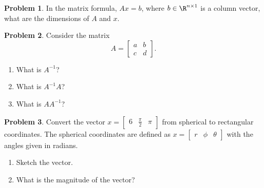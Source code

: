 \documentclass[10pt]{article}
\theoremstyle{definition}
\newtheorem{prob}{Problem}[section]
\newenvironment{subprob}%
{\renewcommand{\theenumi}{\alph{enumi}}\renewcommand{\labelenumi}{(\theenumi)}\begin{enumerate}}%
{\end{enumerate}}%
\begin{document}
\begin{prob}
    In the matrix formula, \( A x = b \), where \( b \in \R^{n\times1} \) is a column vector, what are the dimensions of \( A \) and \(x \).
\end{prob}

\begin{prob}
    Consider the matrix 
    \begin{equation}
    A = \begin{bmatrix} a & b \\ c & d \end{bmatrix}.
    \end{equation}
    \begin{subprob}
    \item What is \( A^{-1} \)?
    \item What is \( A^{-1} A \)?
    \item What is \( A A^{-1} \)?
    \end{subprob}
\end{prob}

\begin{prob}
Convert the vector \( x = \begin{bmatrix} 6 & \frac{\pi}{2} & \pi \end{bmatrix}\) from spherical to rectangular coordinates.
The spherical coordinates are defined as \( x = \begin{bmatrix} r & \phi & \theta \end{bmatrix}\) with the angles given in radians.
    \begin{figure}[h]
        \centering

    \end{figure}
    \begin{subprob}
    \item Sketch the vector.
    \item What is the magnitude of the vector?
    \end{subprob}
\end{prob}
\end{document}

